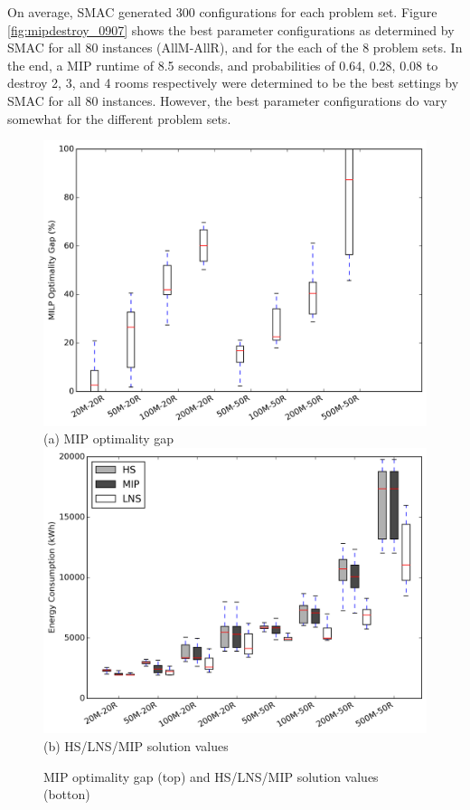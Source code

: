 On average, SMAC generated 300 configurations for each problem set. Figure \ref{fig:mipdestroy_0907} shows the best parameter configurations as determined by SMAC for all 80 instances (AllM-AllR), and for the each of the 8 problem sets. In the end, a MIP runtime of 8.5 seconds, and probabilities of 0.64, 0.28, 0.08 to destroy 2, 3, and 4 rooms respectively were determined to be the best settings by SMAC for all 80 instances. However, the best parameter configurations do vary somewhat for the different problem sets.

\begin{figure}
	\centering
		\includegraphics[width=0.9\linewidth]{figs/mip_optgap_maxdata500.png} \\
(a) MIP optimality gap \\[6pt]
		\includegraphics[width=0.9\linewidth]{figs/lnsmip_mspec_mspec900_shortHS_box_maxdata500.png}\\
(b) HS/LNS/MIP solution values \\[6pt]
	\caption{MIP optimality gap (top) and HS/LNS/MIP solution values (botton)}
	\label{fig:optgap}
\end{figure}

